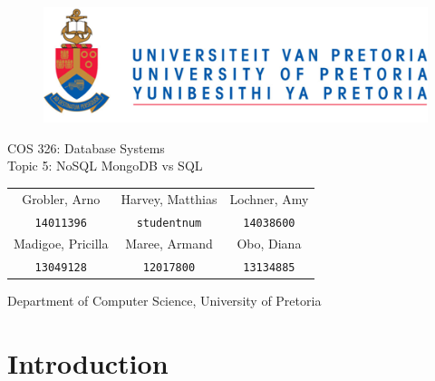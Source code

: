 \documentclass[hidelinks,english]{article}
\date{\today}
\begin{document}
	
	\begin{titlepage}
		\begin{figure}[!t]
			\includegraphics[width=\linewidth]{up_logo.png}
		\end{figure}
		\begin{center}
			\huge{COS 326: Database Systems}\\
			\huge{Topic 5: NoSQL MongoDB vs SQL}\\
			\vspace{10mm}
		\end{center}
		\begin{center}
			\begin{tabular}{ c c c }
				Grobler, Arno & Harvey, Matthias & Lochner, Amy  \\
				\texttt{14011396} & \texttt{studentnum} & \texttt{14038600} \\
				Madigoe, Pricilla & Maree, Armand & Obo, Diana \\
				\texttt{13049128} & \texttt{12017800} & \texttt{13134885} \\				
			\end{tabular}
		\end{center}
		\begin{center}
			Department of Computer Science, University of Pretoria
		\end{center}
	\end{titlepage}
	\newpage
	\tableofcontents
	\newpage
	
   \section{Introduction}
   
   
\end{document}
